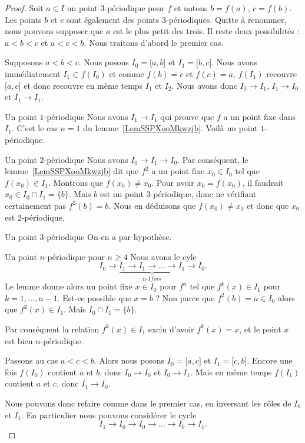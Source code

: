 \begin{proof}
    Soit \( a\in I\) un point \( 3\)-périodique pour \( f\) et notons \( b=f(a)\), \( c=f(b)\). Les points \( b\) et \( c\) sont également des points \( 3\)-périodiques. Quitte à renommer, nous pouvons supposer que \( a\) est le plus petit des trois. Il reste deux possibilités : \( a<b<c\) et \( a<c<b\). Nous traitons d'abord le premier cas.

    Supposons \( a<b<c\). Nous posons \( I_0=\mathopen[ a , b \mathclose]\) et \( I_1=\mathopen[ b , c \mathclose]\). Nous avons immédiatement \( I_1\subset f(I_0)\) et comme \( f(b)=c\) et \( f(c)=a\), \( f(I_1)\) recouvre \( \mathopen[ a , c \mathclose]\) et donc recouvre en même temps \( I_1\) et \( I_2\). Nous avons donc \( I_0\to I_1\), \( I_1\to I_0\) et \( I_1\to I_1\).
    \begin{subproof}
    \item[Un point \( 1\)-périodique]
        Nous avons \( I_1\to I_1\) qui prouve que \( f\) a un point fixe dans \( I_1\). C'est le cas \( n=1\) du lemme~\ref{LemSSPXooMkwzjb}. Voilà un point \( 1\)-périodique.
    \item[Un point \( 2\)-périodique]
        Nous avons \( I_0\to I_1\to I_0\). Par conséquent, le lemme~\ref{LemSSPXooMkwzjb} dit que \( f^2\) a un point fixe \( x_0\in I_0\) tel que \( f(x_0)\in I_1\). Montrons que \( f(x_0)\neq x_0\). Pour avoir \( x_0=f(x_0)\), il faudrait \( x_0\in I_0\cap I_1=\{ b \}\). Mais \( b\) est un point \( 3\)-périodique, donc ne vérifiant certainement pas \( f^2(b)=b\). Nous en déduisons que \( f(x_0)\neq x_0\) et donc que \( x_0\) est \( 2\)-périodique.
    \item[Un point \( 3\)-périodique]
        On en a par hypothèse.
    \item[Un point \( n\)-périodique pour \( n\geq 4\)]
        Nous avons le cyle
        \begin{equation}
            I_0\to \underbrace{I_1\to I_1\to\ldots\to I_1}_{\text{n-1} fois}\to I_0.
        \end{equation}
        Le lemme donne alors un point fixe \( x\in I_0\) pour \( f^n\) tel que \( f^k(x)\in I_1\) pour \( k=1,\ldots, n-1\). Est-ce possible que \( x=b\) ? Non parce que \( f^2(b)=a\in I_0\) alors que \( f^2(x)\in I_1\). Mais \( I_0\cap I_1=\{ b \}\).

        Par conséquent la relation \( f^k(x)\in I_1\) exclu d'avoir \( f^k(x)=x\), et le point \( x\) est bien \( n\)-périodique.
    \end{subproof}

    Passons au cas \( a<c<b\). Alors nous posons \( I_0=\mathopen[ a , c \mathclose]\) et \( I_1=\mathopen[ c , b \mathclose]\). Encore une fois \( f(I_0)\) contient \( a\) et \( b\), donc \( I_0\to I_0\) et \( I_0\to I_1\). Mais en même temps \( f(I_1)\) contient \( a\) et \( c\), donc \( I_1\to I_0\).

    Nous pouvons donc refaire comme dans le premier cas, en inversant les rôles de \( I_0\) et \( I_1\). En particulier nous pouvons considérer le cycle
    \begin{equation}
        I_1\to I_0\to I_0\to\ldots\to I_0\to I_1.
    \end{equation}
\end{proof}


